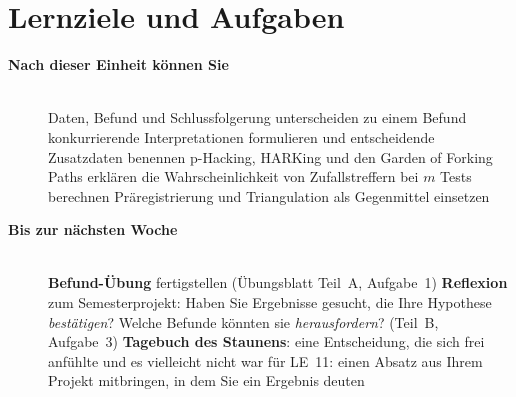 \section{Lernziele und Aufgaben}
\begin{description}
\item[{\rot\bf Nach dieser Einheit können Sie}]~\\[-\lblskip]
\bi
  \ite Daten, Befund und Schlussfolgerung unterscheiden
  \ite zu einem Befund konkurrierende Interpretationen formulieren und
    entscheidende Zusatzdaten benennen
  \ite p-Hacking, HARKing und den Garden of Forking Paths erklären
  \ite die Wahrscheinlichkeit von Zufallstreffern bei $m$ Tests berechnen
  \ite Präregistrierung und Triangulation als Gegenmittel einsetzen
\ei
\os{\newpage}

\item[{\rot\bf Bis zur nächsten Woche}]~\\[-\lblskip]
\bi
  \ite \textbf{Befund-Übung} fertigstellen (Übungsblatt Teil~A, Aufgabe~1)
  \ite \textbf{Reflexion} zum Semesterprojekt: Haben Sie Ergebnisse
    gesucht, die Ihre Hypothese \emph{bestätigen}? Welche Befunde könnten
    sie \emph{herausfordern}? (Teil~B, Aufgabe~3)
  \ite \textbf{Tagebuch des Staunens}: eine Entscheidung, die sich frei
    anfühlte und es vielleicht nicht war
  \ite für LE~11: einen Absatz aus Ihrem Projekt mitbringen, in dem Sie
    ein Ergebnis deuten
\ei
\os{\newpage}
\end{description}

